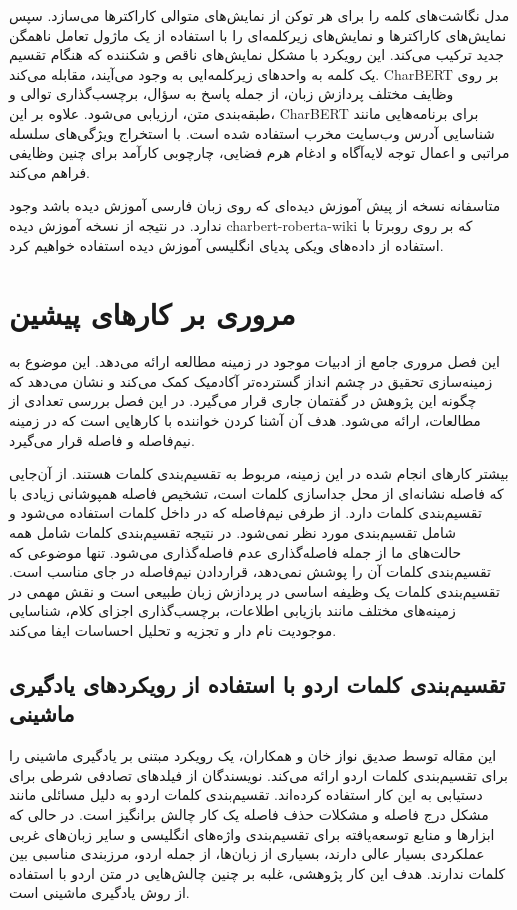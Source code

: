 مدل نگاشت‌های کلمه را برای هر توکن از نمایش‌های متوالی کاراکترها می‌سازد. سپس نمایش‌های کاراکترها و نمایش‌های زیرکلمه‌ای را با استفاده از یک ماژول تعامل ناهمگن جدید ترکیب می‌کند. این رویکرد با مشکل نمایش‌های ناقص و شکننده که هنگام تقسیم یک کلمه به واحدهای زیرکلمه‌ایی به وجود می‌آیند، مقابله می‌کند.
CharBERT بر روی وظایف مختلف پردازش زبان، از جمله پاسخ به سؤال، برچسب‌گذاری توالی و طبقه‌بندی متن، ارزیابی می‌شود.
علاوه بر این، CharBERT برای برنامه‌هایی مانند شناسایی آدرس وب‌سایت مخرب استفاده شده است. با استخراج ویژگی‌های سلسله مراتبی و اعمال توجه لایه‌آگاه و ادغام هرم فضایی، چارچوبی کارآمد برای چنین وظایفی فراهم می‌کند.

متاسفانه نسخه از پیش آموزش دیده‌ای که روی زبان فارسی آموزش دیده باشد وجود ندارد. در نتیجه از نسخه آموزش دیده charbert-roberta-wiki \cite{charbert-roberta-wiki} که بر روی روبرتا با استفاده از داده‌های ویکی پدیای انگلیسی آموزش دیده استفاده خواهیم کرد.
\chapter{مروری بر کار‌های پیشین}
\hspace{30pt}
این فصل  مروری جامع از ادبیات موجود در زمینه مطالعه ارائه می‌دهد. این موضوع به زمینه‌سازی تحقیق در چشم انداز گسترده‌تر آکادمیک کمک می‌کند و نشان می‌دهد که چگونه این پژوهش در گفتمان جاری قرار می‌گیرد. در این فصل بررسی تعدادی از مطالعات، ارائه می‌شود. هدف آن آشنا کردن خواننده با کار‌هایی است که در زمینه نیم‌فاصله و فاصله قرار می‌گیرد.

بیشتر کارهای انجام شده در این زمینه، مربوط به تقسیم‌بندی کلمات هستند. از آن‌جایی که فاصله نشانه‌ای از محل جدا‌سازی کلمات است، تشخیص فاصله همپوشانی زیادی با تقسیم‌بندی کلمات دارد. از طرفی نیم‌فاصله که در داخل کلمات استفاده می‌شود و شامل تقسیم‌بندی مورد نظر نمی‌شود. در نتیجه تقسیم‌بندی کلمات شامل همه‌ حالت‌های ما از جمله فاصله‌گذاری عدم فاصله‌گذاری می‌شود. تنها موضوعی که تقسیم‌بندی کلمات آن را پوشش نمی‌دهد، قراردادن نیم‌فاصله در جای مناسب است. تقسیم‌بندی کلمات یک وظیفه اساسی در پردازش زبان طبیعی است و نقش مهمی در زمینه‌های مختلف مانند بازیابی اطلاعات، برچسب‌گذاری اجزای کلام، شناسایی موجودیت نام دار و تجزیه و تحلیل احساسات ایفا می‌کند.
\section{تقسیم‌بندی کلمات اردو با استفاده از رویکردهای یادگیری ماشینی}
\hspace{30pt}
این مقاله توسط صدیق نواز خان و همکاران، یک رویکرد مبتنی بر یادگیری ماشینی را برای تقسیم‌بندی کلمات اردو ارائه می‌کند. نویسندگان از فیلدهای تصادفی شرطی  برای دستیابی به این کار استفاده کرده‌اند.\cite{khan2018urdu}
 تقسیم‌بندی کلمات اردو به دلیل مسائلی مانند مشکل درج فاصله و مشکلات حذف فاصله یک کار چالش برانگیز است. در حالی که ابزارها و منابع توسعه‌یافته برای تقسیم‌بندی واژه‌های انگلیسی و سایر زبان‌های غربی عملکردی بسیار عالی دارند، بسیاری از زبان‌ها، از جمله اردو، مرزبندی مناسبی بین کلمات ندارند. هدف این کار پژوهشی، غلبه بر چنین چالش‌هایی در متن اردو با استفاده از روش‌ یادگیری ماشینی است.

